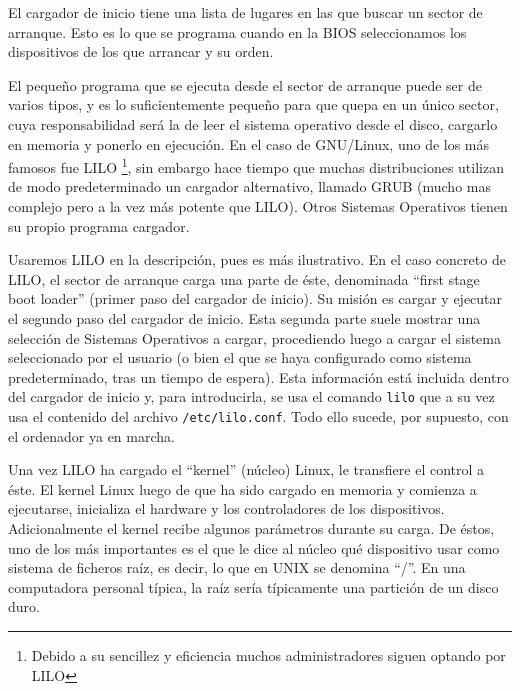 \documentclass[12pt]{article}
\begin{document}
El cargador de inicio tiene una lista de lugares en las que buscar un sector de
arranque. Esto es lo que se programa cuando en la BIOS seleccionamos los dispositivos
de los que arrancar y su orden.

El pequeño programa que se ejecuta desde el sector de arranque puede ser de
varios tipos, y es lo suficientemente pequeño para que quepa en un único sector, 
cuya responsabilidad será la de leer el sistema operativo desde el disco, cargarlo 
en memoria y ponerlo en ejecución. En el caso de GNU/Linux, uno de los más famosos fue LILO
\footnote{Debido a su sencillez y eficiencia muchos administradores siguen 
optando por LILO}, sin embargo 
hace tiempo que muchas distribuciones utilizan de modo predeterminado un cargador alternativo,
llamado GRUB (mucho mas complejo pero a la vez más potente que LILO). Otros Sistemas Operativos 
tienen su propio programa cargador.

Usaremos LILO en la descripción, pues es más ilustrativo.
En el caso concreto de LILO, el sector de arranque carga una parte
de éste, denominada ``first stage boot loader'' (primer paso del cargador de inicio).
Su misión es cargar y ejecutar el segundo paso del cargador de inicio.
Esta segunda parte suele mostrar una selección de Sistemas Operativos a cargar,
procediendo luego a cargar el sistema seleccionado por el usuario (o bien el
que se haya configurado como sistema predeterminado, tras un tiempo de espera). 
Esta información está incluida dentro del cargador de inicio
y, para introducirla, se usa el comando \texttt{lilo} que a su vez usa el contenido del
archivo \texttt{/etc/lilo.conf}. Todo ello sucede, por supuesto, con el ordenador ya en marcha.

Una vez LILO ha cargado el ``kernel'' (núcleo) Linux, le transfiere el control a éste.
El kernel Linux luego de que ha sido cargado en memoria y comienza a
ejecutarse, inicializa el hardware y los controladores de los dispositivos. 
Adicionalmente el kernel recibe algunos parámetros durante su carga. De éstos, 
uno de los más importantes es el que le dice al núcleo qué dispositivo usar 
como sistema de ficheros raíz, es decir, lo
que en UNIX se denomina ``/''. En una computadora personal típica, la raíz sería
típicamente una partición de un disco duro. 
\end{document}
